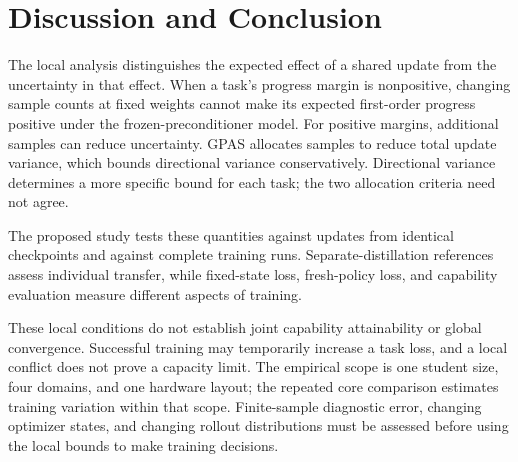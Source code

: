 \section{Discussion and Conclusion}
\label{sec:conclusion}

The local analysis distinguishes the expected effect of a shared update
from the uncertainty in that effect. When a task's progress margin is
nonpositive, changing sample counts at fixed weights cannot make its
expected first-order progress positive under the frozen-preconditioner
model. For positive margins, additional samples can reduce uncertainty.
GPAS allocates samples to reduce total update variance, which bounds
directional variance conservatively. Directional variance determines a more specific
bound for each task; the two allocation criteria need not agree.

The proposed study tests these quantities against updates from identical
checkpoints and against complete training runs. Separate-distillation
references assess individual transfer, while fixed-state loss, fresh-policy
loss, and capability evaluation measure different aspects of training.

These local conditions do not establish joint capability attainability or
global convergence. Successful training may temporarily increase a task
loss, and a local conflict does not prove a capacity limit. The empirical
scope is one student size, four domains, and one hardware layout; the
repeated core comparison estimates training variation within that scope.
Finite-sample diagnostic error, changing optimizer states, and changing
rollout distributions must be assessed before using the local bounds to
make training decisions.
